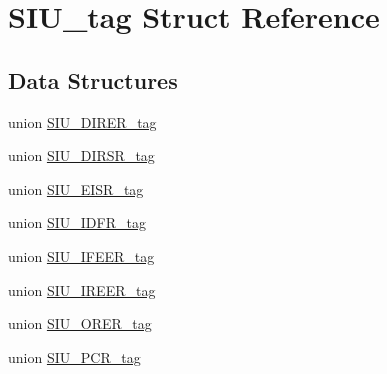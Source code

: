 \hypertarget{structSIU__tag}{}\section{S\+I\+U\+\_\+tag Struct Reference}
\label{structSIU__tag}
\subsection*{Data Structures}
\begin{DoxyCompactItemize}
\item 
union \mbox{\hyperlink{unionSIU__tag_1_1SIU__DIRER__tag}{S\+I\+U\+\_\+\+D\+I\+R\+E\+R\+\_\+tag}}
\item 
union \mbox{\hyperlink{unionSIU__tag_1_1SIU__DIRSR__tag}{S\+I\+U\+\_\+\+D\+I\+R\+S\+R\+\_\+tag}}
\item 
union \mbox{\hyperlink{unionSIU__tag_1_1SIU__EISR__tag}{S\+I\+U\+\_\+\+E\+I\+S\+R\+\_\+tag}}
\item 
union \mbox{\hyperlink{unionSIU__tag_1_1SIU__IDFR__tag}{S\+I\+U\+\_\+\+I\+D\+F\+R\+\_\+tag}}
\item 
union \mbox{\hyperlink{unionSIU__tag_1_1SIU__IFEER__tag}{S\+I\+U\+\_\+\+I\+F\+E\+E\+R\+\_\+tag}}
\item 
union \mbox{\hyperlink{unionSIU__tag_1_1SIU__IREER__tag}{S\+I\+U\+\_\+\+I\+R\+E\+E\+R\+\_\+tag}}
\item 
union \mbox{\hyperlink{unionSIU__tag_1_1SIU__ORER__tag}{S\+I\+U\+\_\+\+O\+R\+E\+R\+\_\+tag}}
\item 
union \mbox{\hyperlink{unionSIU__tag_1_1SIU__PCR__tag}{S\+I\+U\+\_\+\+P\+C\+R\+\_\+tag}}
\end{DoxyCompactItemize}
